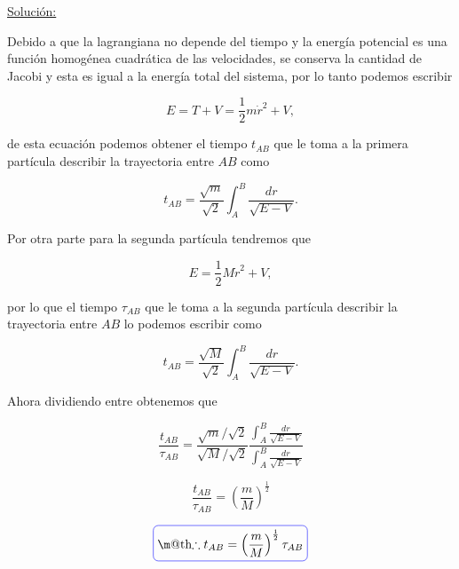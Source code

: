 \documentclass[a4paper,10pt]{article}
\makeatletter
\numberwithin{equation}{section}
\newcommand*{\boxcolor}{blue}
\renewcommand{\boxed}[1]{\textcolor{\boxcolor}{%
\tikz[baseline={([yshift=-1ex]current bounding box.center)}] \node [rectangle, minimum width=1ex,rounded corners,draw] {\normalcolor\m@th$\displaystyle#1$};}}
\makeatother
\begin{document}
\vspace{.3cm}

\underline{Solución:} \vspace{.3cm}

Debido a que la lagrangiana no depende del tiempo y la energía potencial 
es una función homogénea cuadrática de las velocidades, se conserva la cantidad 
de Jacobi y esta es igual a la energía total del sistema, por lo tanto 
podemos escribir

\begin{equation}
 E = T + V = \frac{1}{2}m\dot{r}^2 + V,
\end{equation}

de esta ecuación podemos obtener el tiempo $t_{AB}$ que le toma a la primera 
partícula describir la trayectoria entre $AB$ como

\begin{equation}
 t_{AB} = \frac{\sqrt{m}}{\sqrt{2}} \int_A^B \frac{dr}{\sqrt{E - V}}.
 \label{eq:tiempo1}
\end{equation}

Por otra parte para la segunda partícula tendremos que

\begin{equation}
 E = \frac{1}{2}M\dot{r}^2 + V,
\end{equation}

por lo que el tiempo $\tau_{AB}$ que le toma a la segunda 
partícula describir la trayectoria entre $AB$ lo podemos escribir como

\begin{equation}
 t_{AB} = \frac{\sqrt{M}}{\sqrt{2}} \int_A^B \frac{dr}{\sqrt{E - V}}.
 \label{eq:tiempo2}
\end{equation}

Ahora dividiendo  entre  obtenemos que 

\begin{equation}
 \frac{t_{AB}}{\tau_{AB}} = \frac{\sqrt{m}/\sqrt{2}}{\sqrt{M}/\sqrt{2}} 
 \frac{\int_A^B \frac{dr}{\sqrt{E - V}}}{\int_A^B \frac{dr}{\sqrt{E - V}}}
\end{equation}

\begin{equation}
 \frac{t_{AB}}{\tau_{AB}} = \left(\frac{m}{M}\right)^{\frac{1}{2}}
\end{equation}

\begin{equation}
 \boxed{\therefore t_{AB} = \left(\frac{m}{M}\right)^{\frac{1}{2}}\tau_{AB}}
\end{equation}
\end{document}
